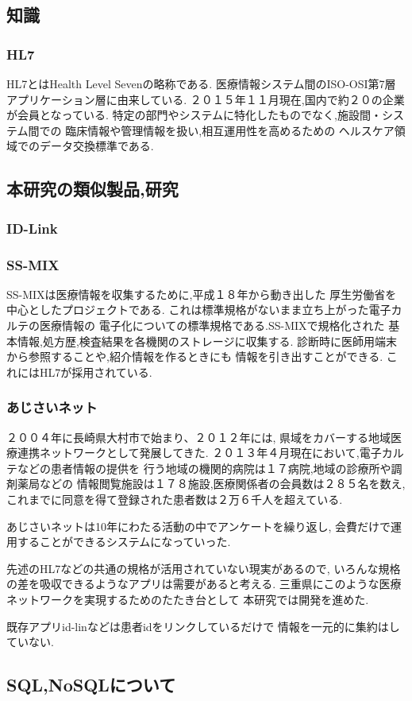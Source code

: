 \subsection{知識}

  \subsubsection{HL7}\cite{bibi5}\cite{bibi6}
  HL7とはHealth Level Sevenの略称である.
  医療情報システム間のISO-OSI第7層アプリケーション層に由来している.
  ２０１５年１１月現在,国内で約２０の企業が会員となっている.
  特定の部門やシステムに特化したものでなく,施設間・システム間での
  臨床情報や管理情報を扱い,相互運用性を高めるための
  ヘルスケア領域でのデータ交換標準である.


  \subsubsection{}

\subsection{本研究の類似製品,研究}
  \subsubsection{ID-Link}

  \subsubsection{SS-MIX}\cite{bibi7}
    SS-MIXは医療情報を収集するために,平成１８年から動き出した
    厚生労働省を中心としたプロジェクトである.
    これは標準規格がないまま立ち上がった電子カルテの医療情報の
    電子化についての標準規格である.SS-MIXで規格化された
    基本情報,処方歴,検査結果を各機関のストレージに収集する.
    診断時に医師用端末から参照することや,紹介情報を作るときにも
    情報を引き出すことができる.
    これにはHL7が採用されている.

  \subsubsection{あじさいネット}\cite{bibi3}
    ２００４年に長崎県大村市で始まり、２０１２年には,
    県域をカバーする地域医療連携ネットワークとして発展してきた.
    ２０１３年４月現在において,電子カルテなどの患者情報の提供を
    行う地域の機関的病院は１７病院,地域の診療所や調剤薬局などの
    情報閲覧施設は１７８施設,医療関係者の会員数は２８５名を数え,
    これまでに同意を得て登録された患者数は２万６千人を超えている.
    
    あじさいネットは10年にわたる活動の中でアンケートを繰り返し,
    会費だけで運用することができるシステムになっていった.

  先述のHL7などの共通の規格が活用されていない現実があるので,
  いろんな規格の差を吸収できるようなアプリは需要があると考える.
  三重県にこのような医療ネットワークを実現するためのたたき台として
  本研究では開発を進めた.

  既存アプリid-linなどは患者idをリンクしているだけで
      情報を一元的に集約はしていない.

\subsection{SQL,NoSQLについて}
